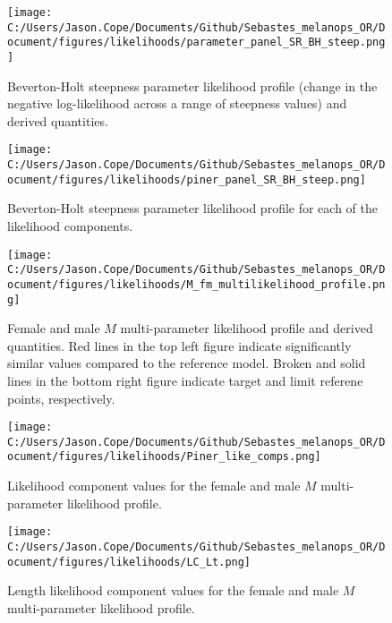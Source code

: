 \documentclass[11pt,
  english,
  letterpaper,
]{article}
\begin{document}
\newpage

\begin{figure}
\centering
\texttt{[image: C:/Users/Jason.Cope/Documents/Github/Sebastes\_melanops\_OR/Document/figures/likelihoods/parameter\_panel\_SR\_BH\_steep.png]}
\caption{Beverton-Holt steepness parameter likelihood profile (change in the negative log-likelihood across a range of steepness values) and derived quantities.\label{fig:steepness-profile}}
\end{figure}

\newpage

\begin{figure}
\centering
\texttt{[image: C:/Users/Jason.Cope/Documents/Github/Sebastes\_melanops\_OR/Document/figures/likelihoods/piner\_panel\_SR\_BH\_steep.png]}
\caption{Beverton-Holt steepness parameter likelihood profile for each of the likelihood components.\label{fig:steepness-profile-components}}
\end{figure}

\newpage

\begin{figure}
\centering
\texttt{[image: C:/Users/Jason.Cope/Documents/Github/Sebastes\_melanops\_OR/Document/figures/likelihoods/M\_fm\_multilikelihood\_profile.png]}
\caption{Female and male \(M\) multi-parameter likelihood profile and derived quantities. Red lines in the top left figure indicate significantly similar values compared to the reference model. Broken and solid lines in the bottom right figure indicate target and limit referene points, respectively.\label{fig:M-multiprofile-combo}}
\end{figure}

\newpage

\begin{figure}
\centering
\texttt{[image: C:/Users/Jason.Cope/Documents/Github/Sebastes\_melanops\_OR/Document/figures/likelihoods/Piner\_like\_comps.png]}
\caption{Likelihood component values for the female and male \(M\) multi-parameter likelihood profile.\label{fig:M-multiprofile-like-components}}
\end{figure}

\newpage

\begin{figure}
\centering
\texttt{[image: C:/Users/Jason.Cope/Documents/Github/Sebastes\_melanops\_OR/Document/figures/likelihoods/LC\_Lt.png]}
\caption{Length likelihood component values for the female and male \(M\) multi-parameter likelihood profile.\label{fig:M-multiprofile-length-components}}
\end{figure}
\end{document}
